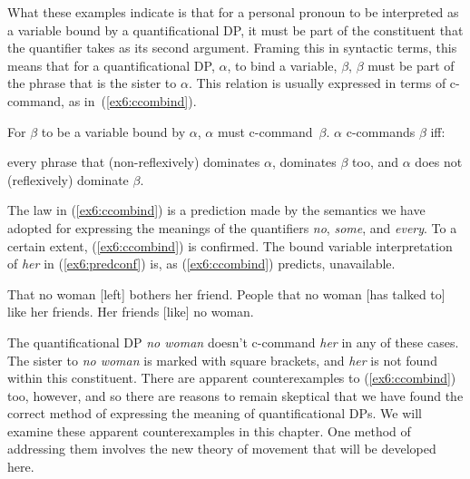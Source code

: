 What these examples indicate is that for a personal pronoun to be interpreted as a variable bound by a quantificational DP, it must be part of the constituent that the quantifier takes as its second argument. Framing this in syntactic terms, this means that for a quantificational DP, $\alpha$, to bind a variable, $\beta$, $\beta$ must be part of the phrase that is the sister to $\alpha$. This relation is usually expressed in terms of c-command, as in~(\ref{ex6:ccombind}).
\begin{exe}
	\raggedright
	\ex \label{ex6:ccombind}
	For $\beta$ to be a variable bound by $\alpha$, $\alpha$ must c-command~$\beta$.
	\ex $\alpha$ c-commands $\beta$ iff:
	\begin{xlist}
		\ex every phrase that (non-reflexively) dominates $\alpha$, dominates $\beta$ too, and
		\ex $\alpha$ does not (reflexively) dominate $\beta$.
	\end{xlist}
\end{exe}
The law in (\ref{ex6:ccombind}) is a prediction made by the semantics we have adopted for expressing the meanings of the quantifiers \emph{no}, \emph{some}, and \emph{every}. To a certain extent, (\ref{ex6:ccombind}) is confirmed. The bound variable interpretation of \emph{her} in (\ref{ex6:predconf}) is, as (\ref{ex6:ccombind}) predicts, unavailable.
\begin{exe}
	\raggedright
	\ex \label{ex6:predconf}
	\begin{xlist}
		\ex That no woman [left] bothers her friend.
		\ex People that no woman [has talked to] like her friends.
		\ex Her friends [like] no woman.
	\end{xlist}
\end{exe}
The quantificational DP \emph{no woman} doesn't c-command \emph{her} in any of these cases. The sister to \emph{no woman} is marked with square brackets, and \emph{her} is not found within this constituent. There are apparent counterexamples to (\ref{ex6:ccombind}) too, however, and so there are reasons to remain skeptical that we have found the correct method of expressing the meaning of quantificational DPs. We will examine these apparent counterexamples in this chapter. One method of addressing them involves the new theory of movement that will be developed here.

